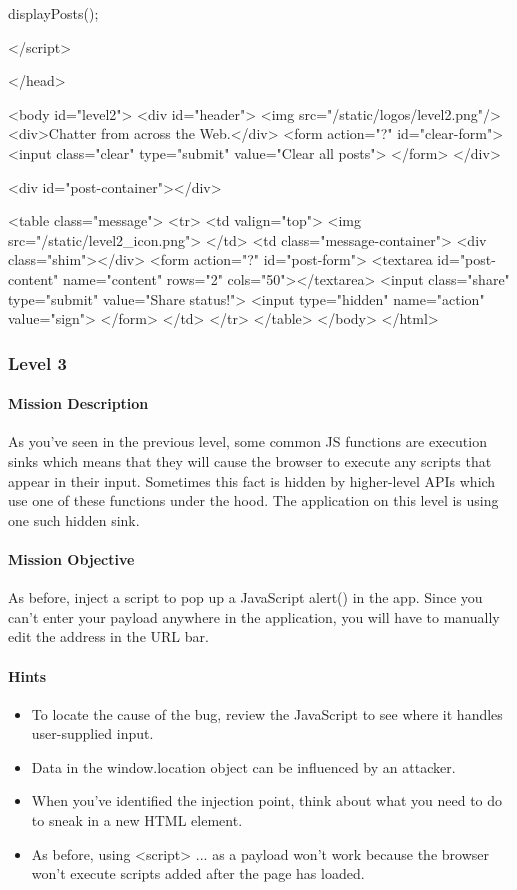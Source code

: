 \begin{Exercise}[label={websec-xss-game}]
\begin{html}
{      displayPosts();
    }
    
    </script>
  
  </head>
  
  <body id="level2">
  <div id="header">
  <img src="/static/logos/level2.png"/>
  <div>Chatter from across the Web.</div>
  <form action="?" id="clear-form">
  <input class="clear" type="submit" value="Clear all posts">
  </form>
  </div>
  
  <div id="post-container"></div>
  
  <table class="message">
  <tr>
  <td valign="top">
  <img src="/static/level2_icon.png">
  </td>
  <td class="message-container">
  <div class="shim"></div>
  <form action="?" id="post-form">
  <textarea id="post-content" name="content" rows="2"
  cols="50"></textarea>
  <input class="share" type="submit" value="Share status!">
  <input type="hidden" name="action" value="sign">
  </form>
  </td>
  </tr>
  </table>
  </body>
</html>
\end{html}

\subsubsection{Level 3}
\paragraph{Mission Description}
As you've seen in the previous level, some common JS functions are execution sinks which means that they will cause the browser to execute any scripts that appear in their input. Sometimes this fact is hidden by higher-level APIs which use one of these functions under the hood. The application on this level is using one such hidden sink.
	
\paragraph{Mission Objective}
As before, inject a script to pop up a JavaScript alert() in the app. 
Since you can't enter your payload anywhere in the application, you will have to manually edit the address in the URL bar.

\paragraph{Hints}
\begin{itemize}
\item To locate the cause of the bug, review the JavaScript to see where it handles user-supplied input.
\item Data in the window.location object can be influenced by an attacker.
\item When you've identified the injection point, think about what you need to do to sneak in a new HTML element.
\item As before, using <script> ... as a payload won't work because the browser won't execute scripts added after the page has loaded.
\end{itemize}


\end{Exercise}
